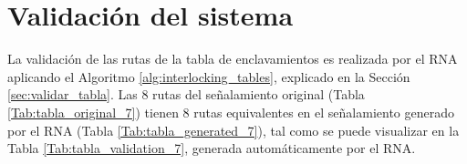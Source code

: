 \section{Validación del sistema}

    La validación de las rutas de la tabla de enclavamientos es realizada por el RNA aplicando el Algoritmo \ref{alg:interlocking_tables}, explicado en la Sección \ref{sec:validar_tabla}. Las 8 rutas del señalamiento original (Tabla \ref{Tab:tabla_original_7}) tienen 8 rutas equivalentes en el señalamiento generado por el RNA (Tabla \ref{Tab:tabla_generated_7}), tal como se puede visualizar en la Tabla \ref{Tab:tabla_validation_7}, generada automáticamente por el RNA.

    \begin{table}[H]
        {
        \caption{Equivalencias entre las rutas originales y las generadas por el RNA.}
        \label{Tab:tabla_validation_7}
        \centering
            \begin{center}
            \end{center}
        }    
    \end{table}
    
